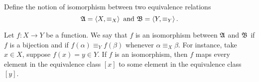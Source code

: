 \begin{problem}[11]
  Define the notion of isomorphism between two equivalence relations
  \[ \mathfrak{A} = \left\langle X,\equiv_X \right\rangle \text{ and } \mathfrak{B} = \left\langle Y,\equiv_Y \right\rangle. \]
\end{problem}
\begin{Answer}
  \step
  Let $f: X \to Y$ be a function.
  We say that $f$ is an isomorphism between $\mathfrak{A}$ and $\mathfrak{B}$
  if $f$ is a bijection and if $f(\alpha) \equiv_Y f(\beta)$
  whenever $\alpha \equiv_X \beta$.
  For instance, take $x \in X$, suppose $f(x) = y \in Y$.
  If $f$ is an isomorphism,
  then $f$ maps every element in the equivalence class $[x]$
  to some element in the equivalence class $[y]$.
\end{Answer}
